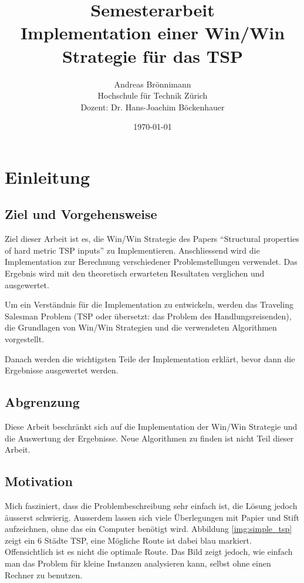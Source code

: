 \documentclass[11pt,a4paper]{article}
\title {Semesterarbeit\\
Implementation einer Win/Win Strategie für das TSP\\}
\author {Andreas Brönnimann\\
Hochschule für Technik Zürich\\
Dozent: Dr. Hans-Joachim Böckenhauer}
\date {\today}
\begin{document}
\nocite{*}

\maketitle
\setcounter{page}{0}
\thispagestyle{empty}
\newpage

\tableofcontents
\newpage
\section{Einleitung}
\subsection{Ziel und Vorgehensweise}
Ziel dieser Arbeit ist es, die Win/Win Strategie des Papers "`Structural properties of hard metric TSP inputs"'\cite{moemke11} zu Implementieren. Anschliessend wird die Implementation zur Berechnung verschiedener Problemstellungen verwendet. Das Ergebnis wird mit den theoretisch erwarteten Resultaten verglichen und ausgewertet.

Um ein Verständnis für die Implementation zu entwickeln, werden das Traveling Salesman Problem (TSP oder übersetzt: das Problem des Handlungsreisenden), die Grundlagen von Win/Win Strategien und die verwendeten Algorithmen vorgestellt. 

Danach werden die wichtigsten Teile der Implementation erklärt, bevor dann die Ergebnisse ausgewertet werden. 

\subsection{Abgrenzung}
Diese Arbeit beschränkt sich auf die Implementation der Win/Win Strategie und die Auswertung der Ergebnisse. Neue Algorithmen zu finden ist nicht Teil dieser Arbeit.

\subsection{Motivation}
Mich fasziniert, dass die Problembeschreibung sehr einfach ist, die Lösung jedoch äusserst schwierig.
Ausserdem lassen sich viele Überlegungen mit Papier und Stift aufzeichnen, ohne das ein Computer benötigt wird. 
Abbildung \ref{img:simple_tsp} zeigt ein 6 Städte TSP, eine Mögliche Route ist dabei blau markiert. Offensichtlich ist es nicht die optimale Route. Das Bild zeigt jedoch, wie einfach man das Problem für kleine Instanzen analysieren kann, selbst ohne einen Rechner zu benutzen.
\end{document}
